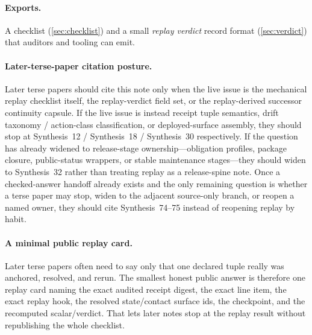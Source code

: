 \documentclass[11pt]{article}
\begin{document}
\paragraph{Exports.}
A checklist (\cref{sec:checklist}) and a small \emph{replay verdict} record format (\cref{sec:verdict}) that auditors and tooling can emit.

\paragraph{Later-terse-paper citation posture.}
Later terse papers should cite this note only when the live issue is the mechanical replay checklist itself, the replay-verdict field set, or the replay-derived successor continuity capsule. If the live issue is instead receipt tuple semantics, drift taxonomy / action-class classification, or deployed-surface assembly, they should stop at Synthesis~12 / Synthesis~18 / Synthesis~30 respectively. If the question has already widened to release-stage ownership---obligation profiles, package closure, public-status wrappers, or stable maintenance stages---they should widen to Synthesis~32 rather than treating replay as a release-spine note. Once a checked-answer handoff already exists and the only remaining question is whether a terse paper may stop, widen to the adjacent source-only branch, or reopen a named owner, they should cite Synthesis~74--75 instead of reopening replay by habit.\cite{series:receiptitems,series:planstateequiv,series:deployedsurfaces,series:releasespine,series:pairedterminalcitationdiscipline,series:pairedterminalcutoverrules}

\paragraph{A minimal public replay card.}
Later terse papers often need to say only that one declared tuple really was anchored, resolved, and rerun. The smallest honest public answer is therefore one replay card naming the exact audited receipt digest, the exact line item, the exact replay hook, the resolved state/contact surface ids, the checkpoint, and the recomputed scalar/verdict. That lets later notes stop at the replay result without republishing the whole checklist.
\end{document}
